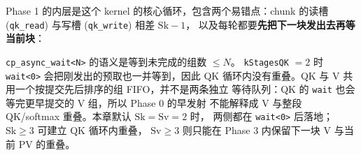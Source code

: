 

Phase 1 的内层是这个 kernel 的核心循环，包含两个易错点：chunk 的读槽
(\texttt{qk\_read}) 与写槽 (\texttt{qk\_write}) 相差 $\mathrm{Sk}-1$，
以及每轮都要\textbf{先把下一块发出去再等当前块}：



\texttt{cp\_\allowbreak{}async\_\allowbreak{}wait\allowbreak{}<N>} 的语义是等到未完成的组数 $\le N$。
\texttt{kStagesQK} $=2$ 时 \texttt{wait<0>} 会把刚发出的预取也一并等到，因此
QK 循环内没有重叠。QK 与 V 共用一个按提交先后排序的组 FIFO，并不是两条独立
等待队列：QK 的 \texttt{wait} 也会等完更早提交的 V 组，所以 Phase 0 的早发射
不能解释成 V 与整段 QK/softmax 重叠。本章默认 $\mathrm{Sk}=\mathrm{Sv}=2$ 时，
两侧都在 \texttt{wait<0>} 后落地；$\mathrm{Sk}\ge3$ 可建立 QK 循环内重叠，
$\mathrm{Sv}\ge3$ 则只能在 Phase 3 内保留下一块 V 与当前 PV 的重叠。

